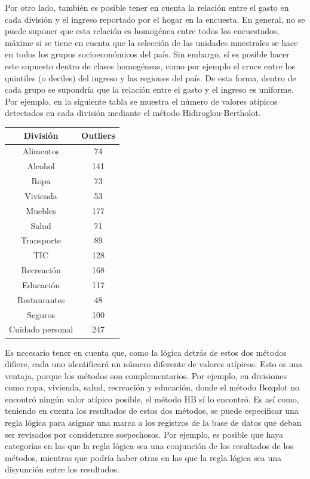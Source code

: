 \documentclass[
  12pt,
  spanish,
]{book}
\begin{document}
Por otro lado, también es posible tener en cuenta la relación entre el gasto en cada división y el ingreso reportado por el hogar en la encuesta. En general, no se puede suponer que esta relación es homogénea entre todos los encuestados, máxime si se tiene en cuenta que la selección de las unidades muestrales se hace en todos los grupos socioeconómicos del país. Sin embargo, sí es posible hacer este supuesto dentro de clases homogéneas, como por ejemplo el cruce entre los quintiles (o deciles) del ingreso y las regiones del país. De esta forma, dentro de cada grupo se supondría que la relación entre el gasto y el ingreso es uniforme. Por ejemplo, en la siguiente tabla se muestra el número de valores atípicos detectados en cada división mediante el método Hidiroglou-Bertholot.

\begin{longtable}[]{@{}cc@{}}
\toprule
División & Outliers \\
\midrule
\endhead
Alimentos & 74 \\
Alcohol & 141 \\
Ropa & 73 \\
Vivienda & 53 \\
Muebles & 177 \\
Salud & 71 \\
Transporte & 89 \\
TIC & 128 \\
Recreación & 168 \\
Educación & 117 \\
Restaurantes & 48 \\
Seguros & 100 \\
Cuidado personal & 247 \\
\bottomrule
\end{longtable}

Es necesario tener en cuenta que, como la lógica detrás de estos dos métodos difiere, cada uno identificará un número diferente de valores atípicos. Esto es una ventaja, porque los métodos son complementarios. Por ejemplo, en divisiones como ropa, vivienda, salud, recreación y educación, donde el método Boxplot no encontró ningún valor atípico posible, el método HB sí lo encontró. Es así como, teniendo en cuenta los resultados de estos dos métodos, se puede especificar una regla lógica para asignar una marca a los registros de la base de datos que deban ser revisados por considerarse sospechosos. Por ejemplo, es posible que haya categorías en las que la regla lógica sea una conjunción de los resultados de los métodos, mientras que podría haber otras en las que la regla lógica sea una disyunción entre los resultados.
\end{document}
